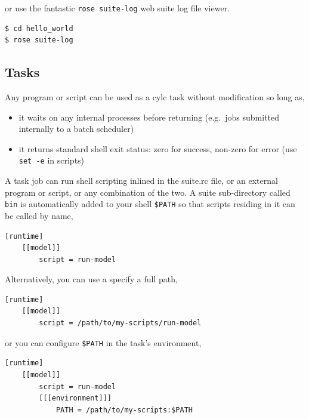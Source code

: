 or use the fantastic \lstinline{rose suite-log} web suite log file viewer.

\begin{lstlisting}[language=bash]
$ cd hello_world
$ rose suite-log
\end{lstlisting}


\subsection{Tasks}
\label{Tasks}

Any program or script can be used as a cylc task without modification so long as,
\begin{itemize}
    \item it waits on any internal processes before returning (e.g.\ jobs
        submitted internally to a batch scheduler)
    \item it returns standard shell exit status: zero for success, non-zero
        for error (use \lstinline{set -e} in scripts)
\end{itemize}


A task job can run shell scripting inlined in the suite.rc file, or an
external program or script, or any combination of the two.  A suite
sub-directory called \lstinline{bin} is automatically added to your shell
\lstinline{$PATH} so that scripts residing in it can be called by name,

\begin{lstlisting}[language=suiterc]
[runtime]
    [[model]]
        script = run-model
\end{lstlisting}

Alternatively, you can use a specify a full path,

\begin{lstlisting}[language=suiterc]
[runtime]
    [[model]]
        script = /path/to/my-scripts/run-model
\end{lstlisting}

or you can configure \lstinline{$PATH} in the task's environment,
\begin{lstlisting}[language=suiterc]
[runtime]
    [[model]]
        script = run-model
        [[[environment]]]
            PATH = /path/to/my-scripts:$PATH
\end{lstlisting}

